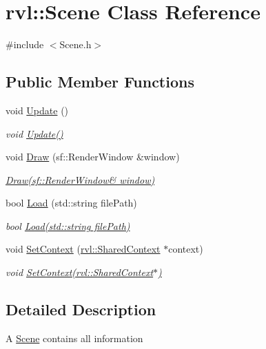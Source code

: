 \hypertarget{classrvl_1_1_scene}{}\section{rvl\+:\+:Scene Class Reference}
\label{classrvl_1_1_scene}


{\ttfamily \#include $<$Scene.\+h$>$}

\subsection*{Public Member Functions}
\begin{DoxyCompactItemize}
\item 
void \hyperlink{classrvl_1_1_scene_ae6675125abb9ee6dc2e1be81aef3e270}{Update} ()
\begin{DoxyCompactList}\small\item\em void \hyperlink{classrvl_1_1_scene_ae6675125abb9ee6dc2e1be81aef3e270}{Update()} \end{DoxyCompactList}\item 
void \hyperlink{classrvl_1_1_scene_a62dd092ce10da061bb2bbb49eb0607db}{Draw} (sf\+::\+Render\+Window \&window)
\begin{DoxyCompactList}\small\item\em \hyperlink{classrvl_1_1_scene_a62dd092ce10da061bb2bbb49eb0607db}{Draw(sf\+::\+Render\+Window\& window)} \end{DoxyCompactList}\item 
bool \hyperlink{classrvl_1_1_scene_ab871b7005408e83aaf2df91051338c5f}{Load} (std\+::string file\+Path)
\begin{DoxyCompactList}\small\item\em bool \hyperlink{classrvl_1_1_scene_ab871b7005408e83aaf2df91051338c5f}{Load(std\+::string file\+Path)} \end{DoxyCompactList}\item 
void \hyperlink{classrvl_1_1_scene_ae45e2625cb99dd8ccb4a304fa70791bb}{Set\+Context} (\hyperlink{structrvl_1_1_shared_context}{rvl\+::\+Shared\+Context} $\ast$context)
\begin{DoxyCompactList}\small\item\em void \hyperlink{classrvl_1_1_scene_ae45e2625cb99dd8ccb4a304fa70791bb}{Set\+Context(rvl\+::\+Shared\+Context$\ast$)} \end{DoxyCompactList}\end{DoxyCompactItemize}


\subsection{Detailed Description}
A \hyperlink{classrvl_1_1_scene}{Scene} contains all information 

